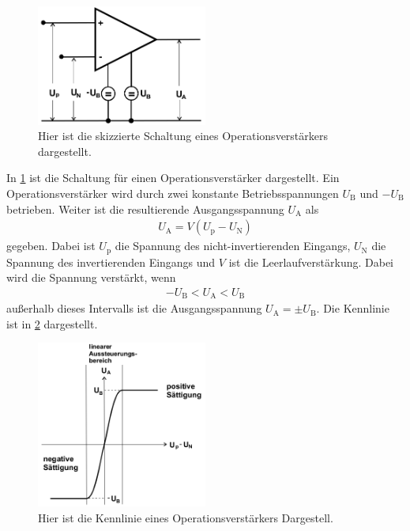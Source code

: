 
\begin{figure}[h!]
	\centering
	\includegraphics[width= 0.5\textwidth]{../Grafiken/OP_Schaltung.png}
	\caption{Hier ist die skizzierte Schaltung eines Operationsverstärkers dargestellt. \cite{V51}\label{fig:OP_Schaltung}}
\end{figure}
In \cref{fig:OP_Schaltung} ist die Schaltung für einen Operationsverstärker dargestellt.
Ein Operationsverstärker wird durch zwei konstante Betriebsspannungen $U_\text{B}$ und $-U_\text{B}$ betrieben.
Weiter ist die resultierende Ausgangsspannung $U_\text{A}$ als
\begin{align}
	U_\text{A}=V(U_\text{p}-U_\text{N})
\end{align}
gegeben. 
Dabei ist $U_\text{p}$ die Spannung des nicht-invertierenden Eingangs, $U_\text{N}$ die Spannung des invertierenden Eingangs und $V$ ist die Leerlaufverstärkung.
Dabei wird die Spannung verstärkt, wenn 
\begin{align*}
	-U_\text{B}<U_\text{A}<U_\text{B}
\end{align*}
außerhalb dieses Intervalls ist die Ausgangsspannung $U_\text{A}=\pm U_\text{B}$.
Die Kennlinie ist in \cref{fig:Kennlinie} dargestellt.
\begin{figure}
	\centering
	\includegraphics[width = 0.5\textwidth]{../Grafiken/Op_Kennlinie.png}
	\caption{Hier ist die Kennlinie eines Operationsverstärkers Dargestell. \cite{V51}\label{fig:Kennlinie}}
\end{figure} 
